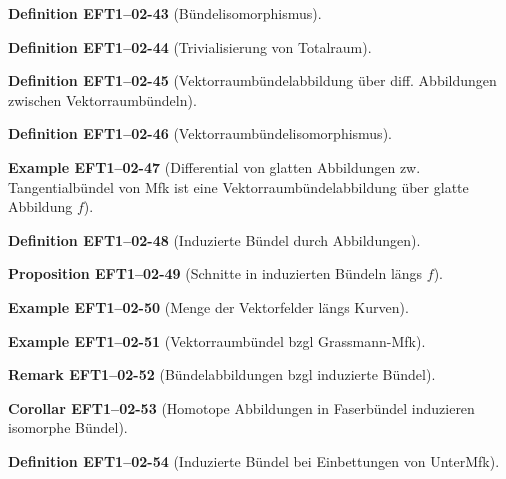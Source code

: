 \documentclass[10pt, letterpaper]{article}
\newcommand{\CustomHeading}[3]{%
  \par\medskip\noindent%
  \textbf{#1 #2} \textnormal{(#3)}.\enskip%
}
\newenvironment{DEF}[2]{\CustomHeading{Definition}{#1}{#2}}{}
\newenvironment{PROP}[2]{\CustomHeading{Proposition}{#1}{#2}}{}
\newenvironment{KORO}[2]{\CustomHeading{Corollar}{#1}{#2}}{}
\newenvironment{REM}[2]{\CustomHeading{Remark}{#1}{#2}}{}
\newenvironment{EXA}[2]{\CustomHeading{Example}{#1}{#2}}{}
\begin{document}
\begin{DEF}{EFT1--02-43}{Bündelisomorphismus}
\end{DEF}

\begin{DEF}{EFT1--02-44}{Trivialisierung von Totalraum}
\end{DEF}

\begin{DEF}{EFT1--02-45}{Vektorraumbündelabbildung über diff. Abbildungen zwischen Vektorraumbündeln}
\end{DEF}

\begin{DEF}{EFT1--02-46}{Vektorraumbündelisomorphismus}
\end{DEF}

\begin{EXA}{EFT1--02-47}{Differential von glatten Abbildungen zw. Tangentialbündel von Mfk ist eine Vektorraumbündelabbildung über glatte Abbildung $f$}
\end{EXA}

\begin{DEF}{EFT1--02-48}{Induzierte Bündel durch Abbildungen}
\end{DEF}

\begin{PROP}{EFT1--02-49}{Schnitte in induzierten Bündeln längs $f$}
\end{PROP}

\begin{EXA}{EFT1--02-50}{Menge der Vektorfelder längs Kurven}
\end{EXA}

\begin{EXA}{EFT1--02-51}{Vektorraumbündel bzgl Grassmann-Mfk}
\end{EXA}

\begin{REM}{EFT1--02-52}{Bündelabbildungen bzgl induzierte Bündel}
\end{REM}

\begin{KORO}{EFT1--02-53}{Homotope Abbildungen in Faserbündel induzieren isomorphe Bündel}
\end{KORO}

\begin{DEF}{EFT1--02-54}{Induzierte Bündel bei Einbettungen von UnterMfk}
\end{DEF}
\end{document}
